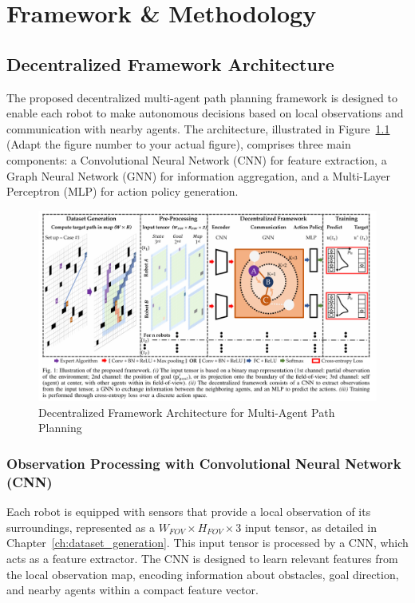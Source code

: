 \chapter{Framework \& Methodology}
\label{chap:methodology}

\section{Decentralized Framework Architecture}

The proposed decentralized multi-agent path planning framework is designed to enable each robot to make autonomous decisions based on local observations and communication with nearby agents. The architecture, illustrated in Figure~\ref{fig:framework_architecture} (Adapt the figure number to your actual figure), comprises three main components: a Convolutional Neural Network (CNN) for feature extraction, a Graph Neural Network (GNN) for information aggregation, and a Multi-Layer Perceptron (MLP) for action policy generation.

\begin{figure}[h]
    \centering
    \includegraphics[width=1\textwidth]{images/framework_figure.png} %
    \caption{Decentralized Framework Architecture for Multi-Agent Path Planning}
    \label{fig:framework_architecture}
\end{figure}

\subsection{Observation Processing with Convolutional Neural Network (CNN)}

Each robot is equipped with sensors that provide a local observation of its surroundings, represented as a $W_{FOV} \times H_{FOV} \times 3$ input tensor, as detailed in Chapter~\ref{ch:dataset_generation}. This input tensor is processed by a CNN, which acts as a feature extractor. The CNN is designed to learn relevant features from the local observation map, encoding information about obstacles, goal direction, and nearby agents within a compact feature vector.

